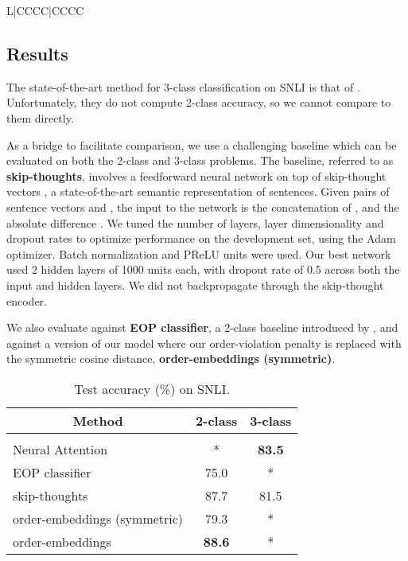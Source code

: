 \documentclass{article} \usepackage{iclr2016_conference,times}
\begin{document}
\begin{table*}[t]
\begin{tabulary}{\linewidth}{L|CCCC|CCCC}
\subsection{Results}
The state-of-the-art method for 3-class classification on SNLI is that of \citet{rocktaschel2015reasoning}. Unfortunately, they do not compute 2-class accuracy, so we cannot compare to them directly.

As a bridge to facilitate comparison, we use a challenging baseline which can be evaluated on both the 2-class and 3-class problems. The baseline, referred to as \textbf{skip-thoughts},  involves a feedforward neural network on top of skip-thought vectors \citep{kiros2015skip}, a state-of-the-art semantic representation of sentences. Given pairs of sentence vectors  and , the input to the network is the concatenation of ,  and the absolute difference . We tuned the number of layers, layer dimensionality and dropout rates to optimize performance on the development set, using the Adam optimizer. Batch normalization \citep{ioffe2015batch} and PReLU units \citep{he2015delving} were used. Our best network used 2 hidden layers of 1000 units each, with dropout rate of 0.5 across both the input and hidden layers. We did not backpropagate through the skip-thought encoder.

We also evaluate against \textbf{EOP classifier}, a 2-class baseline introduced by \citep{snli}, and against a version of our model where our order-violation penalty is replaced with the symmetric cosine distance, \textbf{order-embeddings (symmetric)}.

\begin{table}[t]
	\begin{center}
		\begin{tabular}{lcc}
		
			\multicolumn{1}{c}{\bf Method}  &\multicolumn{1}{c}{\bf 2-class} &\multicolumn{1}{c}{\bf 3-class}
			\\ \hline \\
			Neural Attention \citep{rocktaschel2015reasoning} & * & \textbf{83.5}\\
			EOP classifier \citep{snli} & 75.0 & * \\
			skip-thoughts  & 87.7 & 81.5\\
			order-embeddings (symmetric) & 79.3 & *\\
			order-embeddings  & \textbf{88.6} & *\\
		\end{tabular}
	\end{center}
	\caption{Test accuracy (\%) on SNLI. }
		\label{table:snli}
	\vspace{-2mm}
\end{table}


\end{tabulary}
\end{table*}
\end{document}
